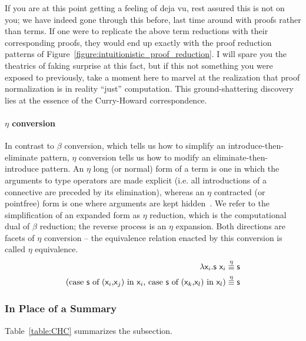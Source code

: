 If you are at this point getting a feeling of deja vu, rest assured this is not on you; we have indeed gone through this before, last time around with proofs rather than terms.
If one were to replicate the above term reductions with their corresponding proofs, they would end up exactly with the proof reduction patterns of Figure~\ref{figure:intuitionistic_proof_reduction}.
I will spare you the theatrics of faking surprise at this fact, but if this not something you were exposed to previously, take a moment here to marvel at the realization that proof normalization is in reality ``just'' computation.
This ground-shattering discovery lies at the essence of the Curry-Howard correspondence.

\paragraph{$\eta$ conversion}
In contrast to $\beta$ conversion, which tells us how to simplify an introduce-then-eliminate pattern, $\eta$ conversion tells us how to modify an eliminate-then-introduce pattern.
An $\eta$ long (or normal) form of a term is one in which the arguments to type operators are made explicit (i.e. all introductions of a connective are preceded by its elimination), whereas an $\eta$ contracted (or pointfree) form is one where arguments are kept hidden~\cite{prawitz1965proof}.
We refer to the simplification of an expanded form as $\eta$ reduction, which is the computational dual of $\beta$ reduction; 
the reverse process is an $\eta$ expansion.
Both directions are facets of $\eta$ conversion -- the equivalence relation enacted by this conversion is called $\eta$ equivalence.
\begin{align}
	\mathsf{\mathnormal{\lambda} \mathsf{x}_{\mathnormal{i}} .s~\mathsf{x}_{\mathnormal{i}} } & \overset{\eta}{\equiv} \mathsf{s}\\
	\textrm{(case \ensuremath{\mathsf{s}} of (\ensuremath{\mathsf{\mathsf{x}_{\mathnormal{i}} }},\ensuremath{\mathsf{\mathsf{x}_{\mathnormal{j}}}}) in \ensuremath{\mathsf{\mathsf{x}_{\mathnormal{i}} }}, case \ensuremath{\mathsf{s}} of (\ensuremath{\mathsf{\mathsf{x}_{\mathnormal{k}}}},\ensuremath{\mathsf{\mathsf{x}_{\mathnormal{l}}}}) in \ensuremath{\mathsf{\mathsf{x}_{\mathnormal{l}}}})} & \overset{\eta}{\equiv} \mathsf{s}
\end{align}


\subsubsection{In Place of a Summary}
Table~\ref{table:CHC} summarizes the subsection.

